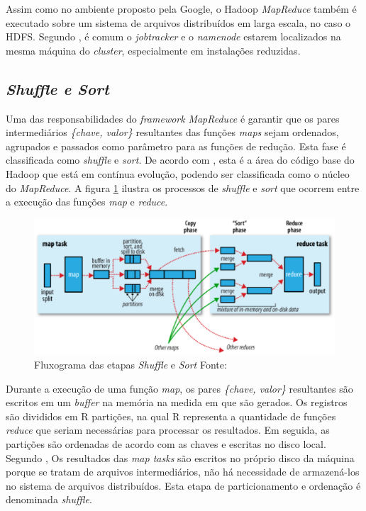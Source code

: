 Assim como no ambiente proposto pela Google, o Hadoop \textit{MapReduce} também é executado sobre um sistema de arquivos distribuídos em larga escala, no caso o HDFS. Segundo , é comum o \textit{jobtracker} e o \textit{namenode} estarem localizados na mesma máquina do \textit{cluster}, especialmente em instalações reduzidas.

\subsection{\textit{Shuffle e Sort}}

Uma das responsabilidades do \textit{framework} \textit{MapReduce} é garantir que os pares intermediários \textit{\{chave, valor\}} resultantes das funções \textit{maps} sejam ordenados, agrupados e passados como parâmetro para as funções de redução. Esta fase é classificada como \textit{shuffle} e \textit{sort}. De acordo com , esta é a área do código base do Hadoop que está em contínua evolução, podendo ser classificada como o núcleo do \textit{MapReduce}. A figura \ref{fig-shuffle} ilustra os processos de \textit{shuffle} e \textit{sort} que ocorrem entre a execução das funções \textit{map} e \textit{reduce}.

\begin{figure}[ht!]
	\centering
	\includegraphics[keepaspectratio=true,scale=0.6]
	  {figuras/shuffle.eps}
	\caption[Fluxograma das etapas \textit{Shuffle} e \textit{Sort}]{Fluxograma das etapas \textit{Shuffle} e \textit{Sort}
	\protect\linebreak Fonte: \cite{white2012}}
	\label{fig-shuffle}
\end{figure}
\FloatBarrier

Durante a execução de uma função \textit{map}, os pares \textit{\{chave, valor\}} resultantes são escritos em um \textit{buffer} na memória na medida em que são gerados. Os registros são divididos em R partições, na qual R representa a quantidade de funções \textit{reduce} que seriam necessárias para processar os resultados. Em seguida, as partições são ordenadas de acordo com as chaves e escritas no disco local. Segundo , Os resultados das \textit{map tasks} são escritos no próprio disco da máquina porque se tratam de arquivos intermediários, não há necessidade de armazená-los no sistema de arquivos distribuídos. Esta etapa de particionamento e ordenação é denominada \textit{shuffle}.

